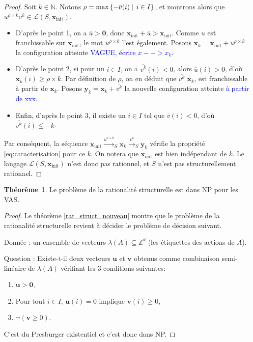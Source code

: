 \documentclass[a4paper,final]{article}
\theoremstyle{definition}
\newtheorem{Theorem}{Théorème}
\let\leq\leqslant
\let\geq\geqslant
\newcommand{\alain}[1]{\textcolor{blue}{#1}}
\newcommand{\set}[2]{\left\{#1\mathrel{\left|\vphantom{#1}\vphantom{#2}\right.}#2\right\}}
\newcommand{\N}{\ensuremath{\mathbb{N}}}
\newcommand{\Z}{\ensuremath{\mathbb{Z}}}
\newcommand{\lang}{\ensuremath{\mathcal{L}}}
\newcommand{\trans}[2]{\ensuremath{\stackrel{#1}{\longrightarrow}_{#2}}}
\newcommand{\vect}[1]{\ensuremath{\mathbf{#1}}}
\newcommand{\xinit}{\ensuremath{\vect{x}_\text{init}}}
\newcommand{\valeur}[1]{\ensuremath{\overline{#1}}}
\begin{document}
\begin{proof}
Soit $k\in\N$.
Notons $\rho = \text{max}\set{-\valeur{v}(i)}{i\in I}$, 
et montrons alors que $u^{\rho\times k} v^k \in \lang(S,\xinit)$.

\begin{itemize}
    \item D'après le point 1, on a $\valeur{u} > \vect{0}$, donc $\xinit + \valeur{u} > \xinit$.
    Comme $u$ est franchissable sur $\xinit$, le mot $u^{\rho\times k}$ l'est également.
    Posons $\vect{x}_k = \xinit + \valeur{u^{\rho\times k}}$ la configuration atteinte \alain{VAGUE, écrire $x-->x_k$.}
    
    \item D'après le point 2, si pour un $i\in I$, on a $\valeur{v^k}(i) < 0$, alors $\valeur{u}(i) > 0$, d'où $\vect{x}_k(i) \geq \rho\times k$.
    Par définition de $\rho$, on en déduit que $\valeur{v^k}$  $\vect{x}_k$,  est franchissable à partir de $\vect{x}_k$.
    Posons $\vect{y}_k = \vect{x}_k + \valeur{v^k}$ la nouvelle configuration atteinte \alain{à partir de xxx}.
    
    \item Enfin, d'après le point 3, il existe un $i\in I$ tel que $\valeur{v}(i) < 0$, d'où $\valeur{v^k}(i) \leq -k$.
\end{itemize}

Par conséquent,  la séquence $\xinit \trans{u^{\rho\times k}}{S} \vect{x}_k \trans{v^k}{S} \vect{y}_k$ vérifie la propriété \eqref{eq:caracterisation} pour ce $k$.
On notera que $\xinit$ est bien indépendant de $k$.
Le langage $\lang(S,\xinit)$ n'est donc pas rationnel, et $S$ n'est pas structurellement rationnel.
\end{proof}

\begin{Theorem}\label{NP conf_struct_rat}
Le  problème de la rationalité structurelle est dans NP pour les VAS.
\end{Theorem}

\begin{proof}
Le théorème \ref{rat_struct_nouveau} montre que le problème de la rationalité structurelle revient à décider le problème de décision suivant.

Donnée : un ensemble de vecteurs $\lambda(A) \subseteq \Z^d$ (les étiquettes des actions de $A$).

Question : Existe-t-il deux vecteurs $\vect{u}$ et $\vect{v}$ obtenus comme combinaison semi-linéaire de $\lambda(A)$ vérifiant les 3 conditions suivantes:
\begin{enumerate}
    \item $\vect{u} > \vect{0}$,
    \item Pour tout $i \in I$, $\vect{u}(i)=0$ implique $\vect{v}(i) \geq 0$,
    \item  $\lnot(\vect{v} \geq 0)$.
\end{enumerate}
C'est du Presburger existentiel et c'est donc dans NP.
\end{proof}
\end{document}
